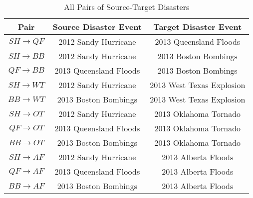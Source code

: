 \begin{table}[ht]
    \begin{center}
    \caption{All Pairs of Source-Target Disasters}
    \begin{tabular}[c]{|c|c|c|}
        \hline
        Pair & Source Disaster Event & Target Disaster Event  \\
        \hline
        $SH \rightarrow QF$ & 2012 Sandy Hurricane & 2013 Queensland Floods \\

        $SH \rightarrow BB$ & 2012 Sandy Hurricane & 2013 Boston Bombings \\
        $QF \rightarrow BB$ & 2013 Queensland Floods & 2013 Boston Bombings \\

        $SH \rightarrow WT$ & 2012 Sandy Hurricane & 2013 West Texas Explosion \\
        $BB \rightarrow WT$ & 2013 Boston Bombings & 2013 West Texas Explosion \\

        $SH \rightarrow OT$ & 2012 Sandy Hurricane & 2013 Oklahoma Tornado \\
        $QF \rightarrow OT$ & 2013 Queensland Floods & 2013 Oklahoma Tornado \\
        $BB \rightarrow OT$ & 2013 Boston Bombings & 2013 Oklahoma Tornado  \\

        $SH \rightarrow AF$ & 2012 Sandy Hurricane & 2013 Alberta Floods \\
        $QF \rightarrow AF$ & 2013 Queensland Floods & 2013 Alberta Floods \\
        $BB \rightarrow AF$ & 2013 Boston Bombings & 2013 Alberta Floods \\
        \hline
    \end{tabular}
    \label{tableadddata}
   \end{center}
\end{table}

